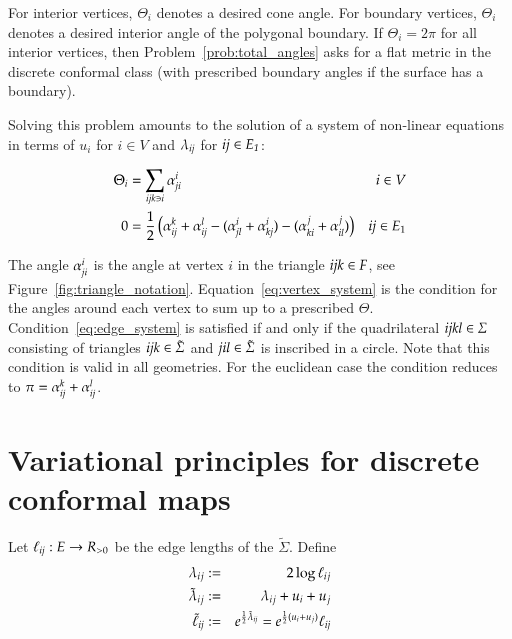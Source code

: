 \documentclass[Thesis]{subfiles}
\begin{document}
For interior vertices, $\Theta_i$ denotes a desired cone angle. For
boundary vertices, $\Theta_i$ denotes a desired interior angle of the
polygonal boundary. If $\Theta_{i}=2\pi$ for all interior vertices,
then Problem~\ref{prob:total_angles} asks for a flat metric in the
discrete conformal class (with prescribed boundary angles if the
surface has a boundary).

Solving this problem amounts to the solution of a system of non-linear 
equations in terms of $u_i$ for $i\in V$ and $\lambda_{\it ij}$ for $\it ij \in E_1$:

\begin{align}
	\Theta_i &=\sum_{\it ijk \ni i}\alpha_{\it ji}^i & i\in V\label{eq:vertex_system}\\
	0 &= \frac{1}{2}\left(\alpha_{\it ij}^k + \alpha_{\it ij}^l - (\alpha^i_{\it jl} + \alpha^i_{\it kj}) - (\alpha^j_{\it ki} + \alpha^j_{\it il})\right)& \textit{ij} \in E_1\label{eq:edge_system}
\end{align}

The angle $\alpha_{\it ji}^i$ is the angle at vertex $i$ in the triangle $\it ijk\in F$, see Figure~\ref{fig:triangle_notation}.
Equation~\ref{eq:vertex_system} is the condition for the angles around each vertex to sum up to a prescribed $\Theta$.
Condition~\ref{eq:edge_system} is satisfied if and only if the quadrilateral $\it ijkl\in \Sigma$ consisting of triangles $\it ijk\in \tilde \Sigma$ and $\it jil\in \tilde \Sigma$ is inscribed in a circle. Note that this condition is valid in all geometries. For the euclidean case the condition reduces to $\pi=\alpha_{\it ij}^k + \alpha_{\it ij}^l$.

\section{Variational principles for discrete conformal maps}
\label{sec:vari-princ}

\begin{definition}
Let $\ell_{\it ij}:E\to R_{>0}$ be the edge lengths of the $\tilde \Sigma$. Define
\begin{eqnarray*}
\lambda_{ij} &:=& 2\log \ell_{ij}\label{eq:lambda_def}\\
\tilde\lambda_{ij} &:=& \lambda_{ij}+u_i+u_j\\
\tilde \ell_{\it ij} &:=& e^{\frac{1}{2}\tilde \lambda_{\it ij}}=e^{\frac{1}{2}(u_i + u_j)}\ell_{\it ij}
\end{eqnarray*}
\end{definition}
\end{document}
